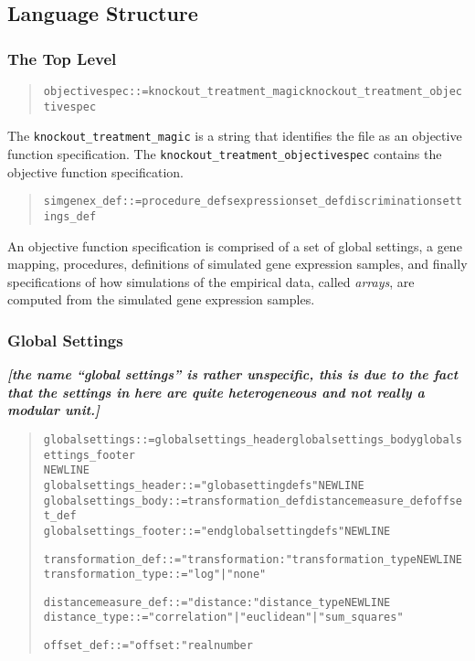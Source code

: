 \documentclass[a4paper,fleqn]{article}
\newcommand{\computercode}[1]{\texttt{#1}}
\newcommand{\newterm}[1]{\emph{#1}}
\newcommand{\todo}[1]{\rule{0pt}{0pt}\marginpar{\rule{1ex}{1ex}}\textbf{\emph{[#1]}}}
\newenvironment{ebnfrule}{\begin{footnotesize}\begin{quote}\begin{alltt}}{\end{alltt}\end{quote}\end{footnotesize}}
\begin{document}
\subsection{Language Structure}

\subsubsection{The Top Level}

\begin{ebnfrule}
objectivespec ::= knockout_treatment_magic knockout_treatment_objectivespec
\end{ebnfrule}
The \computercode{knockout\_treatment\_magic} is a string that
identifies the file as an objective function specification. The
\computercode{knockout\_treatment\_objectivespec} contains the
objective function specification.

\begin{ebnfrule}
simgenex_def ::= procedure_defs expressionset_def discriminationsettings_def
\end{ebnfrule}
An objective function specification is comprised of a set of global
settings, a gene mapping, procedures, definitions of simulated gene
expression samples, and finally specifications of how simulations of
the empirical data, called \newterm{arrays}, are computed from the
simulated gene expression samples.


\subsubsection{Global Settings}

\todo{the name ``global settings'' is rather unspecific, this is due
  to the fact that the settings in here are quite heterogeneous and
  not really a modular unit.}

\begin{ebnfrule}
globalsettings ::= globalsettings_header globalsettings_body globalsettings_footer
NEWLINE
globalsettings_header ::= "globasettingdefs" NEWLINE
globalsettings_body ::= transformation_def distancemeasure_def offset_def
globalsettings_footer ::= "endglobalsettingdefs" NEWLINE

transformation_def ::= "transformation:" transformation_type NEWLINE
transformation_type ::= "log" | "none"

distancemeasure_def ::= "distance:" distance_type NEWLINE
distance_type ::= "correlation" | "euclidean" | "sum_squares" 

offset_def ::= "offset:" realnumber
\end{ebnfrule}
\end{document}

